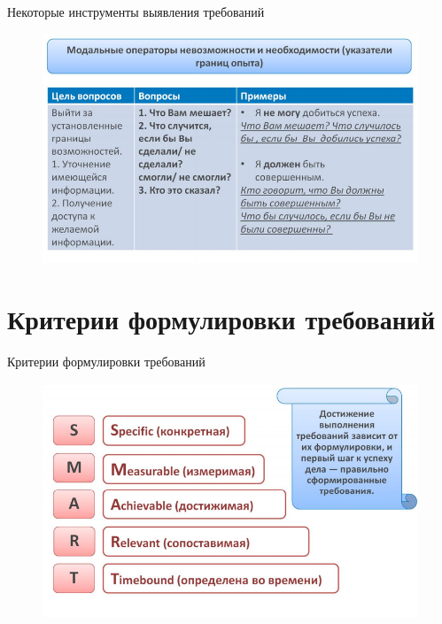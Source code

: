 \documentclass{beamer}
\begin{document}
\begin{frame}[t]{Некоторые инструменты выявления требований}
\begin{figure}[h]
\centering
\includegraphics[scale=0.5]{images/lec02-pic19.png}
\end{figure}
\end{frame}

\section{Критерии формулировки требований}

\begin{frame}[t]{Критерии формулировки требований}
\begin{figure}[h]
\centering
\includegraphics[scale=0.5]{images/lec02-pic20.png}
\end{figure}
\end{frame}
\end{document}
